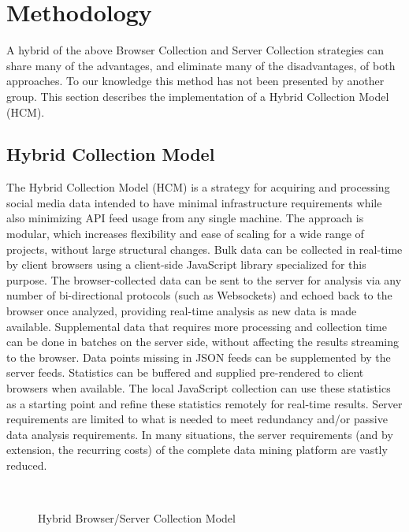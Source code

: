\documentclass[letterpaper]{article}
\begin{document}
\section{Methodology}
A hybrid of the above Browser Collection and Server Collection strategies can share many of the advantages, and eliminate many of the disadvantages, of both approaches. To our knowledge this method has not been presented by another group. This section describes the implementation of a Hybrid Collection Model (HCM).

\subsection{Hybrid Collection Model}
The Hybrid Collection Model (HCM) is a strategy for acquiring and processing social media data intended to have minimal infrastructure requirements while also minimizing API feed usage from any single machine. The approach is modular, which increases flexibility and ease of scaling for a wide range of projects, without large structural changes. Bulk data can be collected in real-time by client browsers using a client-side JavaScript library specialized for this purpose. The browser-collected data can be sent to the server for analysis via any number of bi-directional protocols (such as Websockets) and echoed back to the browser once analyzed, providing real-time analysis as new data is made available. Supplemental data that requires more processing and collection time can be done in batches on the server side, without affecting the results streaming to the browser. Data points missing in JSON feeds can be supplemented by the server feeds. Statistics can be buffered and supplied pre-rendered to client browsers when available. The local JavaScript collection can use these statistics as a starting point and refine these statistics remotely for real-time results. Server requirements are limited to what is needed to meet redundancy and/or passive data analysis requirements. In many situations, the server requirements (and by extension, the recurring costs) of the complete data mining platform are vastly reduced.

\begin{figure}[h!]
    \caption{Hybrid Browser/Server Collection Model}
\end{figure}
\end{document}

